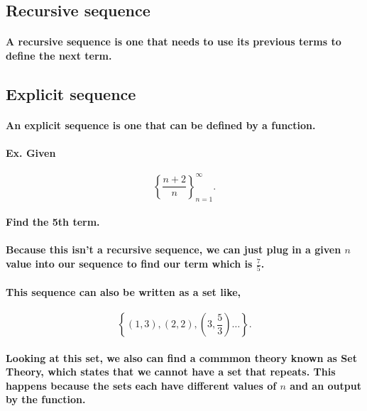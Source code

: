 \subsection{Recursive sequence}%
\label{sub:Recursive sequence}
\paragraph{A recursive sequence is one that needs to use its previous terms to define the next term.}

\subsection{Explicit sequence}%
\label{sub:Explict sequence}

\paragraph{An explicit sequence is one that can be defined by a function.}

\paragraph{Ex. Given}

\[
	\left\{\frac{n+2}{n}\right\}_{n=1}^{\infty}
.\] 
\paragraph{Find the 5th term.}
\paragraph{Because this isn't a recursive sequence, we can just plug in a given $n$ value into our sequence to find our term which is $\frac{7}{5}$. }

\paragraph{This sequence can also be written as a set like,}

\[
	\left\{\left( 1,3 \right), \left( 2,2 \right), \left( 3,\frac{5}{3} \right) \ldots \right\} 
.\] 

\paragraph{Looking at this set, we also can find a commmon theory known as Set Theory, which states that we cannot have a set that repeats. This happens because the sets each have different values of $n$ and an output by the function. }

